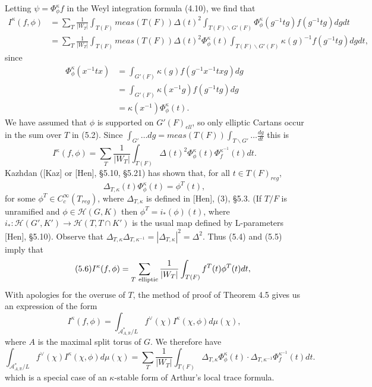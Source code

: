 \documentclass[12pt]{article}
\begin{document}
Letting $\psi=\Phi^\kappa_\phi f$ in the Weyl integration formula (4.10), we find that
\begin{equation}\tag{5.2}
\begin{array}{rl}
I^\kappa(f,\phi)&=\sum_T\frac{1}{|W_T|}\int_{T(F)}meas(T(F))\Delta(t)^2\int_{T(F)\backslash G'(F)}\Phi^\kappa_\phi(g^{-1}tg)f(g^{-1}tg)dgdt\\
&=\sum_T\frac{1}{|W_T|}\int_{T(F)}meas(T(F))\Delta(t)^2\Phi^\kappa_\phi(t)\int_{T(F)\backslash G'(F)}\kappa(g)^{-1}f(g^{-1}tg)dgdt,
\end{array}
\end{equation}
since
\begin{equation}\tag{5.3}
\begin{array}{rl}
\Phi^\kappa_\phi(x^{-1}tx)&=\int_{G'(F)}\kappa(g)f(g^{-1}x^{-1}txg)dg\\
&=\int_{G'(F)}\kappa(x^{-1}g)f(g^{-1}tg)dg\\
&=\kappa(x^{-1})\Phi^\kappa_\phi(t).
\end{array}
\end{equation}
We have assumed that $\phi$ is supported on $G'(F)_{ell}$, so only elliptic Cartans occur in the sum over $T$ in (5.2). Since $\int_{G'}\dots dg=meas(T(F))\int_{T\backslash G'}\dots\frac{dg}{dt}$ this is
\begin{equation}\tag{5.4}
I^\kappa(f,\phi)=\sum_T\frac{1}{|W_T|}\int_{T(F)}\Delta(t)^2\Phi^\kappa_\phi(t)\Phi^{\kappa^{-1}}_f(t)dt.
\end{equation}
Kazhdan ([Kaz] or [Hen], \S5.10, \S5.21) has shown that, for all $t\in T(F)_{reg}$,
\begin{equation}\tag{5.5}
\Delta_{T,\kappa}(t)\Phi^\kappa_\phi(t)=\phi^T(t),
\end{equation}
for some $\phi^T\in C_c^\infty(T_{reg})$, where $\Delta_{T,\kappa}$ is defined in [Hen], (3), \S5.3. (If $T/F$ is unramified and $\phi\in\mathcal{H}(G,K)$ then $\phi^T=i_*(\phi)(t)$, where $i_*:\mathcal{H}(G',K')\rightarrow\mathcal{H}(T,T\cap K')$ is the usual map defined by L-parameters [Hen], \S5.10). Observe that $\Delta_{T,\kappa}\Delta_{T,\kappa^{-1}}=|\Delta_{T,\kappa}|^2=\Delta^2$. Thus (5.4) and (5.5) imply that
\begin{equation}\tag{5.6}
I^\kappa(f,\phi)=\sum_{T\ {\rm elliptic}}\frac{1}{|W_T|}\int_{T(F)}f^T(t)\phi^T(t)dt,
\end{equation}
With apologies for the overuse of $T$, the method of proof of Theorem 4.5 gives us an expression of the form
\begin{equation}\tag{5.7}
I^\kappa(f,\phi)=\int_{\mathcal{A}^*_{A,\mathbb{R}}/L}f^\vee(\chi)I^\kappa(\chi,\phi)d\mu(\chi),
\end{equation}
where $A$ is the maximal split torus of $G$. We therefore have
\begin{equation}\tag{5.8}
\int_{\mathcal{A}^*_{A,\mathbb{R}}/L}f^\vee(\chi)I^\kappa(\chi,\phi)d\mu(\chi)=\sum_T\frac{1}{|W_T|}\int_{T(F)}\Delta_{T,\kappa}\Phi^\kappa_\phi(t)\cdot\Delta_{T,\kappa^{-1}}\Phi^{\kappa^{-1}}_f(t)dt.
\end{equation}
which is a special case of an $\kappa$-stable form of Arthur's local trace formula.
\end{document}
